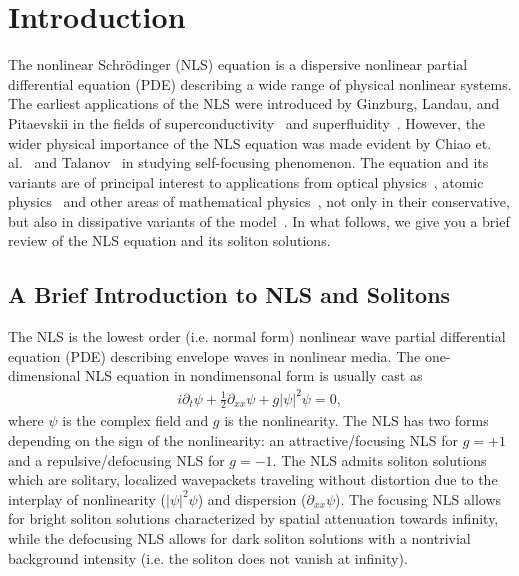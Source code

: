 \chapter{Introduction} %
\label{chap:intro}

The nonlinear Schr\"{o}dinger (NLS) equation is a dispersive nonlinear partial differential equation (PDE) describing a wide range of physical nonlinear systems.   The earliest applications of the NLS were introduced by Ginzburg, Landau, and Pitaevskii in the fields of superconductivity~\cite{Ginzburg1950,Ginzburg1956} and superfluidity~\cite{GinzburgPitaevskii}.  However, the wider physical importance of the NLS equation was made evident by Chiao et. al.~\cite{Chiao1964} and Talanov~\cite{Talanov1964} in studying self-focusing phenomenon.  The equation and its variants are of principal interest
to applications from optical physics~\cite{Kivshar:03}, 
atomic physics~\cite{pitas} and other areas of mathematical
physics~\cite{chap01:ablowitz}, not only in their conservative,
but also in dissipative variants of the model~\cite{Aranson:02}.  In what follows, we give you a brief review of the NLS equation and its soliton solutions.  

\section{A Brief Introduction to NLS and Solitons} %
\label{sec:NLS}

The NLS is the lowest order (i.e. normal form) nonlinear wave partial differential equation (PDE) describing envelope waves in nonlinear media.  The one-dimensional NLS equation in nondimensonal form is usually cast as 
\begin{align}
i \partial_t \psi+ \frac{1}{2}\partial_{xx} \psi + g|\psi|^2 \psi = 0, 
\label{intro:NLS}
\end{align}
where $\psi$ is the complex field and $g$ is the nonlinearity.  The NLS has two forms depending on the sign of the nonlinearity: an attractive/focusing NLS for $g = +1$ and a repulsive/defocusing NLS for $g=-1$.  
The NLS admits soliton solutions which are solitary, localized wavepackets traveling without distortion due to the interplay of nonlinearity ($|\psi|^2 \psi$) and dispersion ($\partial_{xx} \psi$).  The focusing NLS allows for bright soliton solutions characterized by spatial attenuation towards infinity, while the defocusing NLS allows for dark soliton solutions with a nontrivial background intensity (i.e. the soliton does not vanish at infinity).

